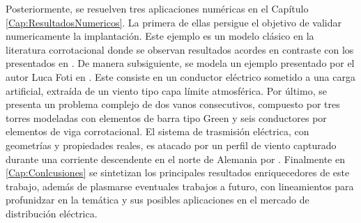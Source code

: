  Posteriormente, se resuelven tres aplicaciones numéricas en el Capítulo \ref{Cap:ResultadosNumericos}. La primera de ellas persigue el objetivo de validar numericamente la implantación. Este ejemplo es un modelo clásico en la literatura corrotacional donde se observan resultados acordes en contraste con los presentados en \cite{Le2014}. De manera subsiguiente, se modela un ejemplo presentado por el autor Luca Foti en \cite{Foti2016}. Este consiste en un conductor eléctrico sometido a una carga artificial, extraída de un viento tipo capa límite atmosférica. Por último, se presenta un problema complejo de dos vanos consecutivos, compuesto por tres torres modeladas con elementos de barra tipo Green y seis conductores por elementos de viga corrotacional. El sistema de trasmisión eléctrica, con geometrías y propiedades reales, es atacado por un perfil de viento capturado durante una corriente descendente en el norte de Alemania por \cite{stengel2017measurements}. Finalmente en  \ref{Cap:Conlcusiones} se sintetizan los principales resultados enriquecedores de este trabajo, además de plasmarse eventuales trabajos a futuro, con lineamientos para profunidzar en la temática y sus posibles aplicaciones en el mercado de distribución eléctrica.
